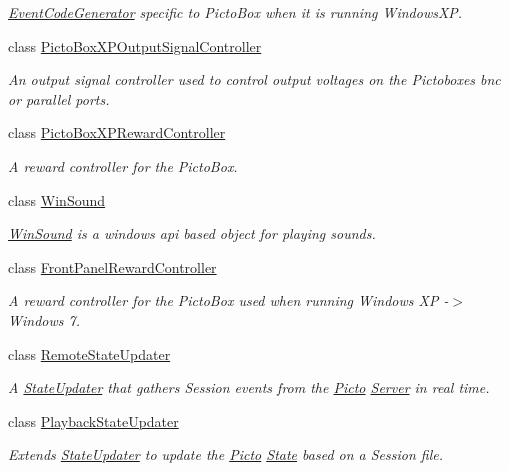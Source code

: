\begin{DoxyCompactItemize}
\begin{DoxyCompactList}\small\item\em \hyperlink{class_picto_1_1_event_code_generator}{Event\-Code\-Generator} specific to Picto\-Box when it is running Windows\-X\-P. \end{DoxyCompactList}\item 
class \hyperlink{class_picto_1_1_picto_box_x_p_output_signal_controller}{Picto\-Box\-X\-P\-Output\-Signal\-Controller}
\begin{DoxyCompactList}\small\item\em An output signal controller used to control output voltages on the Pictoboxes bnc or parallel ports. \end{DoxyCompactList}\item 
class \hyperlink{class_picto_1_1_picto_box_x_p_reward_controller}{Picto\-Box\-X\-P\-Reward\-Controller}
\begin{DoxyCompactList}\small\item\em A reward controller for the Picto\-Box. \end{DoxyCompactList}\item 
class \hyperlink{class_picto_1_1_win_sound}{Win\-Sound}
\begin{DoxyCompactList}\small\item\em \hyperlink{class_picto_1_1_win_sound}{Win\-Sound} is a windows api based object for playing sounds. \end{DoxyCompactList}\item 
class \hyperlink{class_picto_1_1_front_panel_reward_controller}{Front\-Panel\-Reward\-Controller}
\begin{DoxyCompactList}\small\item\em A reward controller for the Picto\-Box used when running Windows X\-P -\/$>$ Windows 7. \end{DoxyCompactList}\item 
class \hyperlink{class_picto_1_1_remote_state_updater}{Remote\-State\-Updater}
\begin{DoxyCompactList}\small\item\em A \hyperlink{class_picto_1_1_state_updater}{State\-Updater} that gathers Session events from the \hyperlink{namespace_picto}{Picto} \hyperlink{class_server}{Server} in real time. \end{DoxyCompactList}\item 
class \hyperlink{class_picto_1_1_playback_state_updater}{Playback\-State\-Updater}
\begin{DoxyCompactList}\small\item\em Extends \hyperlink{class_picto_1_1_state_updater}{State\-Updater} to update the \hyperlink{namespace_picto}{Picto} \hyperlink{class_picto_1_1_state}{State} based on a Session file. \end{DoxyCompactList}\item 

\end{DoxyCompactItemize}
